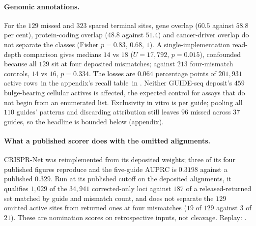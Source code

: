 \paragraph{Genomic annotations.}
For the $129$ missed and $323$ spared terminal sites, gene overlap ($60.5$ against $58.8$
per cent), protein-coding overlap ($48.8$ against $51.4$) and cancer-driver overlap do not
separate the classes (Fisher $p=0.83$, $0.68$, $1$). A single-implementation
read-depth comparison gives medians $14$ vs $18$ ($U=17{,}792$, $p=0.015$), confounded because
all $129$ sit at four deposited mismatches; against $213$ four-mismatch controls, $14$ vs $16$,
$p=0.334$. The losses are $0.064$ percentage points of
$201{,}931$ active rows\ifrecombmode\ in the appendix's recall table\else\ in \fi.
Neither GUIDE-seq deposit's $459$ bulge-bearing cellular actives is affected, the expected
control for assays that do not begin from an enumerated list. Exclusivity in vitro is per guide;
pooling all $110$ guides' patterns and discarding attribution still leaves $96$ missed across
$37$ guides, so the headline is bounded below (appendix).

\paragraph{What a published scorer does with the omitted alignments.}
CRISPR-Net \citep{lin2020crisprnet} was reimplemented from its deposited weights; three of its
four published figures reproduce and the five-guide AUPRC is $0.3198$ against a published $0.329$. Run at its published cutoff on the
deposited alignments, it qualifies $1{,}029$ of the $34{,}941$ corrected-only loci against $187$
of a released-returned set matched by guide and mismatch count, and does not separate the $129$
omitted active sites from returned ones at four mismatches ($19$ of $129$ against $3$ of $21$).
These are nomination scores on retrospective inputs, not cleavage.
Replay: .


